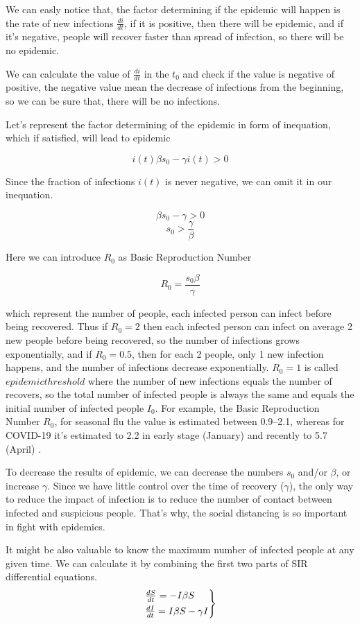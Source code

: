 \documentclass[nostrict]{szablonPG}
\begin{document}
We can easly notice that, the factor determining if the epidemic will happen is the rate of new infections $\frac{di}{dt}$, if it is positive, then there will be epidemic, and if it's negative, people will recover faster than spread of infection, so there will be no epidemic.

We can calculate the value of $\frac{di}{dt}$ in the $t_0$ and check if the value is negative of positive, the negative value mean the decrease of infections from the beginning, so we can be sure that, there will be no infections.

Let's represent the factor determining of the epidemic in form of inequation, which if satisfied, will lead to epidemic

\[i(t) \beta s_0 - \gamma i(t) > 0\]

Since the fraction of infections $i(t)$ is never negative, we can omit it in our inequation.

\[\beta s_0 - \gamma > 0\]
\[ s_0 > \frac{\gamma}{\beta}\]

Here we can introduce $R_0$ as Basic Reproduction Number

\[ R_0 = \frac{s_0 \beta}{\gamma}\]

which represent the number of people, each infected person can infect before being recovered. Thus if $R_0 = 2$ then each infected person can infect on average 2 new people before being recovered, so the number of infections grows exponentially, and if $R_0 = 0.5$, then for each 2 people, only 1 new infection happens, and the number of infections decrease exponentially. $R_0 = 1$ is called $epidemic threshold$ where the number of new infections equals the number of recovers, so the total number of infected people is always the same and equals the initial number of infected people $I_0$. For example, the Basic Reproduction Number $R_0$, for seasonal flu the value is estimated between 0.9–2.1\cite{coburn2009modeling}, whereas for COVID-19 it's estimated to 2.2 in early stage (January) \cite{li2020early} and recently to 5.7 (April) \cite{readeid}.

To decrease the results of epidemic, we can decrease the numbers $s_0$ and/or $\beta$, or increase $\gamma$. Since we have little control over the time of recovery ($\gamma$), the only way to reduce the impact of infection is to reduce the number of contact between infected and suspicious people. That's why, the social distancing is so important in fight with epidemics.


It might be also valuable to know the maximum number of infected people at any given time. We can calculate it by combining the first two parts of SIR differential equations.
\[
\begin{rcases}
\frac{dS}{dt} = - I \beta S \\
\frac{dI}{dt} = I \beta S - \gamma I
\end{rcases}
\]
\end{document}

